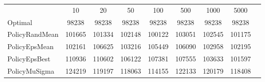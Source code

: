 \begin{tabular}[ht]{|l||c|c|c|c|c|c|c|H}
 & 10 & 20 & 50 & 100 & 500 & 1000 & 5000 & \\  
Optimal &98238 & 98238 & 98238 & 98238 & 98238 & 98238 & 98238 & \\ 
PolicyRandMean &101665 & 101334 & 102148 & 100122 & 103051 & 102545 & 101175 & \\ 
PolicyEpsMean &102161 & 106625 & 103216 & 105449 & 106090 & 102958 & 102195 & \\ 
PolicyEpsBest &110936 & 110602 & 106122 & 107381 & 107555 & 103633 & 101597 & \\ 
PolicyMuSigma &124219 & 119197 & 118063 & 114155 & 122133 & 120179 & 118408 & \\ 
\end{tabular}